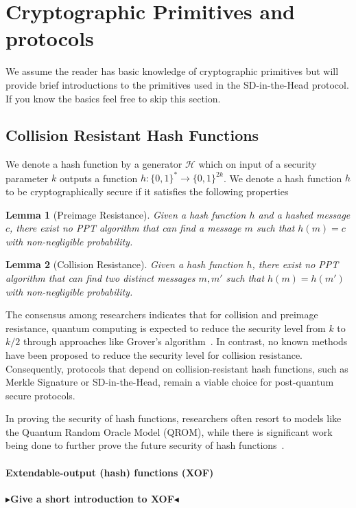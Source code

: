 \documentclass[11pt]{report}
\theoremstyle{definition}
\theoremstyle{plain}
\newtheorem{lemma}{Lemma}[section]
\newcommand{\todo}[1]{{\color[rgb]{.5,0,0}\textbf{$\blacktriangleright$#1$\blacktriangleleft$}}}
\begin{document}
\section{Cryptographic Primitives and protocols}
We assume the reader has basic knowledge of cryptographic primitives but will provide brief introductions to the primitives used in the SD-in-the-Head protocol. If you know the basics feel free to skip this section.

\subsection{Collision Resistant Hash Functions}\label{sec:prelim_hash}
We denote a hash function by a generator $\mathcal{H}$ which on input of a security parameter $k$ outputs a function $h : \{0,1{\}}^* \rightarrow \{0,1{\}}^{2k}$. We denote a hash function $h$ to be cryptographically secure if it satisfies the following properties

\begin{lemma}[Preimage Resistance]\label{lem:preimage}
  Given a hash function $h$ and a hashed message $c$, there exist no PPT algorithm that can find a message $m$ such that $h(m) = c$ with non-negligible probability.
\end{lemma}

\begin{lemma}[Collision Resistance]\label{lem:collision}
  Given a hash function $h$, there exist no PPT algorithm that can find two distinct messages $m, m'$ such that $h(m) = h(m')$ with non-negligible probability.
\end{lemma}

The consensus among researchers indicates that for collision and preimage resistance, quantum computing is expected to reduce the security level from $k$ to $k/2$ through approaches like Grover's algorithm~\cite{nielsen2010quantumgrover}. In contrast, no known methods have been proposed to reduce the security level for collision resistance. Consequently, protocols that depend on collision-resistant hash functions, such as Merkle Signature or SD-in-the-Head, remain a viable choice for post-quantum secure protocols.

In proving the security of hash functions, researchers often resort to models like the Quantum Random Oracle Model (QROM), while there is significant work being done to further prove the future security of hash functions~\cite{dtuPostquantumSecurity}.

\paragraph{Extendable-output (hash) functions (XOF)}\label{sec:xof}
\todo{Give a short introduction to XOF}
\end{document}

